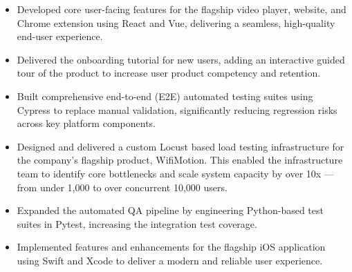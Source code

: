 \documentclass[10pt,a4paper]{altacv}
\begin{document}
\divider

\begin{itemize}
    \item Developed core user-facing features for the flagship video player, website, and Chrome extension using React and Vue, delivering a seamless, high-quality end-user experience.
    \item Delivered the onboarding tutorial for new users, adding an interactive guided tour of the product to increase user product competency and retention.
    \item Built comprehensive end-to-end (E2E) automated testing suites using Cypress to replace manual validation, significantly reducing regression risks across key platform components.
\end{itemize}

\divider

\begin{itemize}
    \item Designed and delivered a custom Locust based load testing infrastructure for the company's flagship product, WifiMotion. This enabled the infrastructure team to identify core bottlenecks and scale system capacity by over 10x --- from under 1,000 to over concurrent 10,000 users.
    \item Expanded the automated QA pipeline by engineering Python-based test suites in Pytest, increasing the integration test coverage.
    \item Implemented features and enhancements for the flagship iOS application using Swift and Xcode to deliver a modern and reliable user experience.
\end{itemize}

\divider

\end{document}
